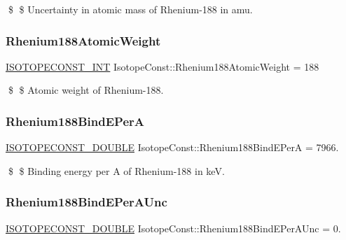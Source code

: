 \$ \$ Uncertainty in atomic mass of Rhenium-\/188 in amu. \mbox{\label{group___isotope_const-_rhenium-_re188_ga9642fcd8bbd29c40ac25001ce5505c94}} 
\subsubsection{\texorpdfstring{Rhenium188\+Atomic\+Weight}{Rhenium188AtomicWeight}}
{\footnotesize\ttfamily \mbox{\hyperlink{group___isotope_const-_macros_ga5f18360b3e99483a35c32d789e62621c}{I\+S\+O\+T\+O\+P\+E\+C\+O\+N\+S\+T\+\_\+\+I\+NT}} Isotope\+Const\+::\+Rhenium188\+Atomic\+Weight = 188}

\$ \$ Atomic weight of Rhenium-\/188. \mbox{\label{group___isotope_const-_rhenium-_re188_gab9a7adacc45faca522f2e16a24af9132}} 
\subsubsection{\texorpdfstring{Rhenium188\+Bind\+E\+PerA}{Rhenium188BindEPerA}}
{\footnotesize\ttfamily \mbox{\hyperlink{group___isotope_const-_macros_ga8f45a7272ce02c0b4c65c44636ed719a}{I\+S\+O\+T\+O\+P\+E\+C\+O\+N\+S\+T\+\_\+\+D\+O\+U\+B\+LE}} Isotope\+Const\+::\+Rhenium188\+Bind\+E\+PerA = 7966.}

\$ \$ Binding energy per A of Rhenium-\/188 in keV. \mbox{\label{group___isotope_const-_rhenium-_re188_gadc210607fcacbf4c6810b5132f17742b}} 
\subsubsection{\texorpdfstring{Rhenium188\+Bind\+E\+Per\+A\+Unc}{Rhenium188BindEPerAUnc}}
{\footnotesize\ttfamily \mbox{\hyperlink{group___isotope_const-_macros_ga8f45a7272ce02c0b4c65c44636ed719a}{I\+S\+O\+T\+O\+P\+E\+C\+O\+N\+S\+T\+\_\+\+D\+O\+U\+B\+LE}} Isotope\+Const\+::\+Rhenium188\+Bind\+E\+Per\+A\+Unc = 0.}

